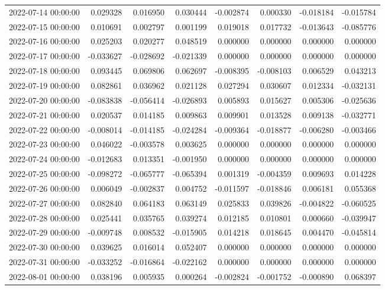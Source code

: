 \begin{tabular}{lrrrrrrr}
2022-07-14 00:00:00 & 0.029328 & 0.016950 & 0.030444 & -0.002874 & 0.000330 & -0.018184 & -0.015784 \\
2022-07-15 00:00:00 & 0.010691 & 0.002797 & 0.001199 & 0.019018 & 0.017732 & -0.013643 & -0.085776 \\
2022-07-16 00:00:00 & 0.025203 & 0.020277 & 0.048519 & 0.000000 & 0.000000 & 0.000000 & 0.000000 \\
2022-07-17 00:00:00 & -0.033627 & -0.028692 & -0.021339 & 0.000000 & 0.000000 & 0.000000 & 0.000000 \\
2022-07-18 00:00:00 & 0.093445 & 0.069806 & 0.062697 & -0.008395 & -0.008103 & 0.006529 & 0.043213 \\
2022-07-19 00:00:00 & 0.082861 & 0.036962 & 0.021128 & 0.027294 & 0.030607 & 0.012334 & -0.032131 \\
2022-07-20 00:00:00 & -0.083838 & -0.056414 & -0.026893 & 0.005893 & 0.015627 & 0.005306 & -0.025636 \\
2022-07-21 00:00:00 & 0.020537 & 0.014185 & 0.009863 & 0.009901 & 0.013528 & 0.009138 & -0.032771 \\
2022-07-22 00:00:00 & -0.008014 & -0.014185 & -0.024284 & -0.009364 & -0.018877 & -0.006280 & -0.003466 \\
2022-07-23 00:00:00 & 0.046022 & -0.003578 & 0.003625 & 0.000000 & 0.000000 & 0.000000 & 0.000000 \\
2022-07-24 00:00:00 & -0.012683 & 0.013351 & -0.001950 & 0.000000 & 0.000000 & 0.000000 & 0.000000 \\
2022-07-25 00:00:00 & -0.098272 & -0.065777 & -0.065394 & 0.001319 & -0.004359 & 0.009693 & 0.014228 \\
2022-07-26 00:00:00 & 0.006049 & -0.002837 & 0.004752 & -0.011597 & -0.018846 & 0.006181 & 0.055368 \\
2022-07-27 00:00:00 & 0.082840 & 0.064183 & 0.063149 & 0.025833 & 0.039826 & -0.004822 & -0.060525 \\
2022-07-28 00:00:00 & 0.025441 & 0.035765 & 0.039274 & 0.012185 & 0.010801 & 0.000660 & -0.039947 \\
2022-07-29 00:00:00 & -0.009748 & 0.008532 & -0.015905 & 0.014218 & 0.018645 & 0.004470 & -0.045814 \\
2022-07-30 00:00:00 & 0.039625 & 0.016014 & 0.052407 & 0.000000 & 0.000000 & 0.000000 & 0.000000 \\
2022-07-31 00:00:00 & -0.033252 & -0.016864 & -0.022162 & 0.000000 & 0.000000 & 0.000000 & 0.000000 \\
2022-08-01 00:00:00 & 0.038196 & 0.005935 & 0.000264 & -0.002824 & -0.001752 & -0.000890 & 0.068397 \\

\end{tabular}
